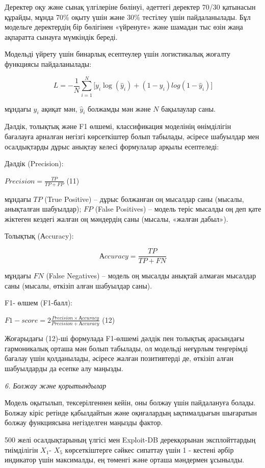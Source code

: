\documentclass[
]{article}
\begin{document}
Деректер оқу және сынақ үлгілеріне бөлінуі, әдеттегі деректер 70/30
қатынасын құрайды, мұнда 70\% оқыту үшін және 30\% тестілеу үшін
пайдаланылады. Бұл модельге деректердің бір бөлігінен «үйренуге» және
шамадан тыс өзін жаңа ақпаратта сынауға мүмкіндік береді.

Модельді үйрету үшін бинарлық есептеулер үшін логистикалық жоғалту
функциясы пайдаланылады:

\[L = - \frac{1}{N}\sum_{i = 1}^{N}{\lbrack y_{i}\log\left( {\widehat{y}}_{i} \right) + (1 - y_{i})log(1 - {\widehat{y}}_{i})\rbrack}\]

мұндағы \(y_{i}\) ақиқат мән, \({\widehat{y}}_{i}\) болжамды мән және
\(N\) бақылаулар саны.

Дәлдік, толықтық және F1 өлшемі, классификация моделінің өнімділігін
бағалауға арналған негізгі көрсеткіштер болып табылады, әсіресе
шабуылдар мен осалдықтарды дұрыс анықтау келесі формулалар арқылы
есептеледі:

Дәлдік (Precision):

\(Precision = \frac{TP}{TP + FP}\) (11)

мұндағы \(TP\) (True Positive) -- дұрыс болжанған оң мысалдар саны
(мысалы, анықталған шабуылдар); \(FP\) (False Positives) -- модель теріс
мысалды оң деп қате жіктеген кездегі жалған оң мәндердің саны (мысалы,
«жалған дабыл»).

Толықтық (Аccuracy):

\[Аccuracy = \frac{TP}{TP + FN}\]

мұндағы \(FN\) (False Negatives) -- модель оң мысалды анықтай алмаған
мысалдар саны (мысалы, өткізіп алған шабуылдар саны).

F1- өлшем (F1-балл):

\(F1 - score = 2\frac{Precision \times Аccuracy}{Precision + Аccuracy}\)
(12)

Жоғарыдағы (12)-ші формулада F1-өлшемі дәлдік пен толықтық арасындағы
гармоникалық орташа мән болып табылады, ол модельді неғұрлым теңгерімді
бағалау үшін қолданылады, әсіресе жалған позитивтерді де, өткізіп алған
шабуылдарды да есепке алу маңызды.

\emph{6. Болжау және қорытындылар}

Модель оқытылып, тексерілгеннен кейін, оны болжау үшін пайдалануға
болады. Болжау кіріс ретінде қабылдайтын және оқиғалардың ықтималдығын
шығаратын болжау функциясына негізделген маңызды фактор.

500 желі осалдықтарының үлгісі мен Exploit-DB дерекқорынан
эксплойттардың тиімділігін \(X_{1}\)- \(X_{5}\) көрсеткіштерге сәйкес
сипаттау үшін 1 - кестені әрбір индикатор үшін максималды, ең төменгі
және орташа мәндермен ұсынылды.
\end{document}
